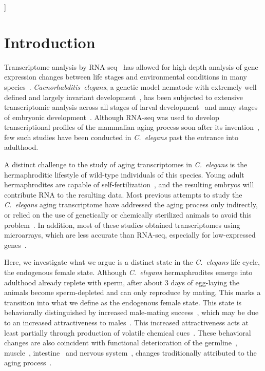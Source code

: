 \documentclass[10pt,letterpaper,twocolumn]{article}
\newcommand{\cel}{\emph{C.~elegans}}
\begin{document}
]
\nolinenumbers{}

\section*{Introduction}
\label{sec:introduction}
Transcriptome analysis by RNA-seq~\cite{Mortazavi2008} has allowed for high
depth analysis of gene expression changes between life stages and environmental
conditions in many species~\cite{Gerstein2014,Blaxter2012}.
\emph{Caenorhabditis~elegans}, a genetic model nematode with extremely
well defined and largely invariant development~\cite{Sulston1977,Sulston1983},
has been subjected to extensive transcriptomic analysis across all stages of
larval development~\cite{Hillier2009,Boeck2016,Murray2012}
and many stages of embryonic development~\cite{Boeck2016}. Although RNA-seq was
used to develop transcriptional profiles of the mammalian aging process soon
after its invention~\cite{Magalhaes2010}, few such studies have been conducted
in \cel{} past the entrance into adulthood.

A distinct challenge to the study of aging transcriptomes in \cel{} is the
hermaphroditic lifestyle of wild-type individuals of this species. Young adult
hermaphrodites are capable of
self-fertilization~\cite{Brenner1974,Corsi2015}, and the resulting
embryos will contribute RNA to the resulting data.
Most previous attempts to study the \cel{} aging transcriptome have addressed
the aging process only indirectly, or relied on the use of genetically or
chemically sterilized animals to avoid this
problem~\cite{Murphy2003,Halaschek-wiener2005,Lund2002,McCormick2012,Eckley2013,
Boeck2016,Rangaraju2015}.
In addition, most of these studies obtained transcriptomes using microarrays,
which are less accurate than RNA-seq, especially for low-expressed
genes~\cite{Wang2014}.

Here, we investigate what we argue is a distinct state in the \cel{} life cycle,
the endogenous female state. Although \cel{} hermaphrodites emerge into adulthood
already replete with sperm, after about 3 days of egg-laying the animals become
sperm-depleted and can only reproduce by mating, This marks a transition into
what we define as the endogenous female state. This state is behaviorally
distinguished by increased male-mating success~\cite{Garcia2007}, which may be
due to an increased attractiveness to males~\cite{Morsci2011}. This increased
attractiveness acts at least partially through production of volatile chemical
cues~\cite{Leighton2014}.
These behavioral changes are also coincident with functional deterioration of
the germline~\cite{Andux2008}, muscle~\cite{Herndon2002},
intestine~\cite{McGee2011} and nervous system~\cite{Liu2013}, changes
traditionally attributed to the aging process~\cite{Golden2007}.
\end{document}
